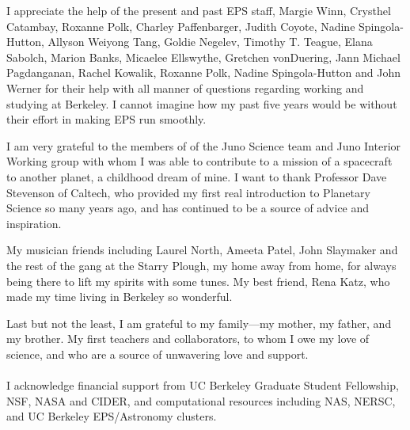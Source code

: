 \documentclass[phd,12pt]{ucbthesis}
\begin{document}
\begin{frontmatter}
\begin{acknowledgements}
I appreciate the help of the present and past EPS staff, Margie Winn, Crysthel
Catambay, Roxanne Polk, Charley Paffenbarger, Judith Coyote, Nadine Spingola-Hutton,
Allyson Weiyong Tang, Goldie Negelev, Timothy T. Teague, Elana Sabolch, Marion Banks,
Micaelee Ellswythe, Gretchen vonDuering, Jann Michael Pagdanganan, Rachel Kowalik,
Roxanne Polk, Nadine Spingola-Hutton and John Werner for their help with all manner
of questions regarding working and studying at Berkeley.  I cannot imagine how my
past five years would be without their effort in making EPS run smoothly.

I am very grateful to the members of of the Juno Science team and Juno Interior
Working group with whom I was able to contribute to a mission of a spacecraft to
another planet, a childhood dream of mine.
I want to thank Professor Dave Stevenson of Caltech, who provided my first real introduction
to Planetary Science so many years ago, and has continued to be a source of advice
and inspiration.

My musician friends including Laurel North, Ameeta Patel, John Slaymaker and the
rest of the gang at the Starry Plough, my home away from home, for always being there
to lift my spirits with some tunes.  My best friend, Rena Katz, who made my time
living in Berkeley so wonderful.

Last but not the least, I am grateful to my family---my mother, my father, and my
brother. My first teachers and collaborators, to whom I owe my love of science, and
who are a source of unwavering love and support. \\\\

I acknowledge financial support from UC Berkeley Graduate Student Fellowship, NSF,
NASA and CIDER, and computational resources including NAS, NERSC, and UC Berkeley
EPS/Astronomy clusters.

\end{acknowledgements}

\end{frontmatter}

\pagestyle{headings}














%
%
%

%
%



\end{document}
